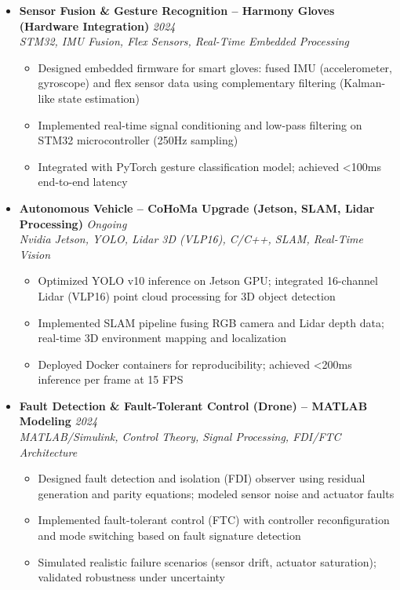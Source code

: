 \documentclass[a4paper,11pt]{article}
\begin{document}
\begin{itemize}[leftmargin=*, label={-}]
\item \textbf{Sensor Fusion \& Gesture Recognition -- Harmony Gloves (Hardware Integration)} \hfill \textit{2024} \\
\textit{STM32, IMU Fusion, Flex Sensors, Real-Time Embedded Processing} \vspace{-2pt}
    \begin{itemize}[leftmargin=0.4cm, nosep, label=\tiny$\bullet$]
        \item Designed embedded firmware for smart gloves: fused IMU (accelerometer, gyroscope) and flex sensor data using complementary filtering (Kalman-like state estimation)
        \item Implemented real-time signal conditioning and low-pass filtering on STM32 microcontroller (250Hz sampling)
        \item Integrated with PyTorch gesture classification model; achieved <100ms end-to-end latency
    \end{itemize}

\item \textbf{Autonomous Vehicle -- CoHoMa Upgrade (Jetson, SLAM, Lidar Processing)} \hfill \textit{Ongoing} \\
\textit{Nvidia Jetson, YOLO, Lidar 3D (VLP16), C/C++, SLAM, Real-Time Vision} \vspace{-2pt}
    \begin{itemize}[leftmargin=0.4cm, nosep, label=\tiny$\bullet$]
        \item Optimized YOLO v10 inference on Jetson GPU; integrated 16-channel Lidar (VLP16) point cloud processing for 3D object detection
        \item Implemented SLAM pipeline fusing RGB camera and Lidar depth data; real-time 3D environment mapping and localization
        \item Deployed Docker containers for reproducibility; achieved <200ms inference per frame at 15 FPS
    \end{itemize}

\item \textbf{Fault Detection \& Fault-Tolerant Control (Drone) -- MATLAB Modeling} \hfill \textit{2024} \\
\textit{MATLAB/Simulink, Control Theory, Signal Processing, FDI/FTC Architecture} \vspace{-2pt}
    \begin{itemize}[leftmargin=0.4cm, nosep, label=\tiny$\bullet$]
        \item Designed fault detection and isolation (FDI) observer using residual generation and parity equations; modeled sensor noise and actuator faults
        \item Implemented fault-tolerant control (FTC) with controller reconfiguration and mode switching based on fault signature detection
        \item Simulated realistic failure scenarios (sensor drift, actuator saturation); validated robustness under uncertainty
    \end{itemize}


\end{itemize}
\end{document}
